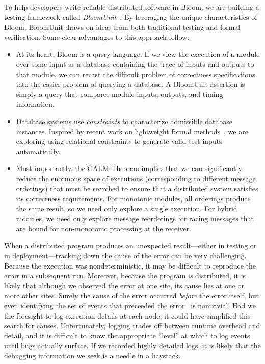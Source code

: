 To help developers write reliable distributed software in Bloom, we are building
a testing framework called \emph{BloomUnit}~\cite{Alvaro2012}. By leveraging the
unique characteristics of Bloom, BloomUnit draws on ideas from both traditional
testing and formal verification. Some clear advantages to this approach follow:

\begin{itemize}
\item
  At its heart, Bloom is a query language.  If we view the execution of a module
  over some input as a database containing the trace of inputs and outputs to
  that module, we can recast the difficult problem of correctness specifications
  into the easier problem of querying a database. A BloomUnit assertion is
  simply a query that compares module inputs, outputs, and timing information.

\item
  Database systems use \emph{constraints} to characterize admissible database
  instances.  Inspired by recent work on lightweight formal
  methods~\cite{Jackson2012}, we are exploring using relational constraints to
  generate valid test inputs automatically.

\item
  Most importantly, the CALM Theorem implies that we can significantly reduce
  the enormous space of executions (corresponding to different message
  orderings) that must be searched to ensure that a distributed system satisfies
  its correctness requirements.  For monotonic modules, all orderings produce
  the same result, so we need only explore a single execution.  For hybrid
  modules, we need only explore message reorderings for racing messages that are
  bound for non-monotonic processing at the receiver.
\end{itemize}

When a distributed program produces an unexpected result---either in testing or in
deployment---tracking down the cause of the error can be very challenging.  Because
the execution was nondeterministic, it may be difficult to reproduce the error in a subsequent
run.  Moreover, because the program is distributed, it is likely that although we observed the 
error at one site, its cause lies at one or more other sites.  Surely the cause of the error
occurred \emph{before} the error itself, but even identifying the set of events that preceeded the 
error~\cite{timeclocks} is nontrivial!  Had we the foresight to log execution details at each node,
it could have simplified this search for causes.  Unfortunately, logging trades off between 
runtime overhead and detail, and it is difficult to know the appropriate ``level'' at which to
log events until bugs actually surface.  If we recorded highly detailed logs, it is likely
that the debugging information we seek is a needle in a haystack.

